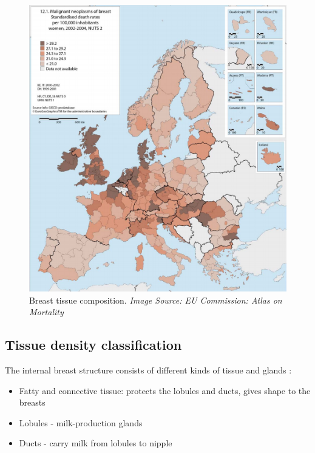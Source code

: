 \begin{figure}[!h]
  \center
  \includegraphics[scale=0.5]{Chapter1/background-img/mortality_EU_Comms.png}
  \caption{Breast tissue composition. \textit{Image Source: EU Commission: Atlas on Mortality \cite{European_Commission_2009}}}
  \label{fig:mortality-band}
\end{figure}

\subsection{Tissue density classification}

The internal breast structure consists of different kinds of tissue and glands \cite{Anatomy_breast}:

\begin{itemize}
  \item Fatty and connective tissue: protects the lobules and ducts, gives shape to the breasts
  \item Lobules - milk-production glands
  \item Ducts - carry milk from lobules to nipple
\end{itemize}

